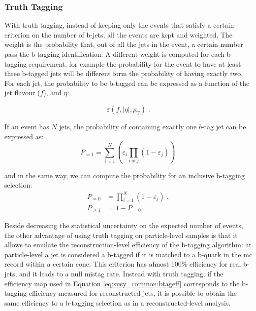 \subsubsection{Truth Tagging}

With truth tagging, instead of keeping only the events that satisfy a certain criterion on the number of b-jets, all the events are kept and weighted. The weight is the probability that, out of all the jets in the event,
a certain number pass the b-tagging identification.
A different weight is computed for each b-tagging requirement, for example the probability for the event to have at least three b-tagged jets will be different form the probability of having exactly two. 
For each jet, the probability to be b-tagged can be expressed as a function of the jet flavour ($f$), \pt and $\eta$:

\begin{equation}
\varepsilon \left(f,|\eta|,p_{\mathrm{T}}\right) \; .
\label{eq:susy_common:btageff}
\end{equation}

\noindent If an event has $N$ jets, the probability of containing exactly one $b$-tag jet can be expressed as:
\begin{equation}
        P_{=1} = \sum\limits_{i=1}^N \left( \varepsilon_{i} \prod\limits_{i \neq j} \left( 1 - \varepsilon_{j} \right) \right) \,
\end{equation}

\noindent and in the same way, we can compute the probability for an inclusive b-tagging selection:
\begin{equation}
 \begin{split}
        P_{=0} &= \prod\limits_{i=1}^N \left( 1 - \varepsilon_{j} \right) \; ,\\
        P_{\geq 1} &= 1 - P_{=0} \; .
 \end{split}
\end{equation} 
 
Beside decreasing the statistical uncertainty on the expected number of events, the other advantage of using truth tagging on particle-level samples is that it allows to emulate the reconstruction-level efficiency of the b-tagging algorithm: 
at particle-level a jet is considered a b-tagged if it is matched to a b-quark in the \gls{mc} record within a certain cone. This criterion has 
almost 100\% efficiency for real b-jets, and it leads to a null mistag rate. Instead with truth tagging, if the efficiency map used in Equation \ref{eq:susy_common:btageff} corresponds to the b-tagging efficiency measured for reconstructed jets, 
it is possible to obtain the same efficiency to a b-tagging selection as in a reconstructed-level analysis. 



